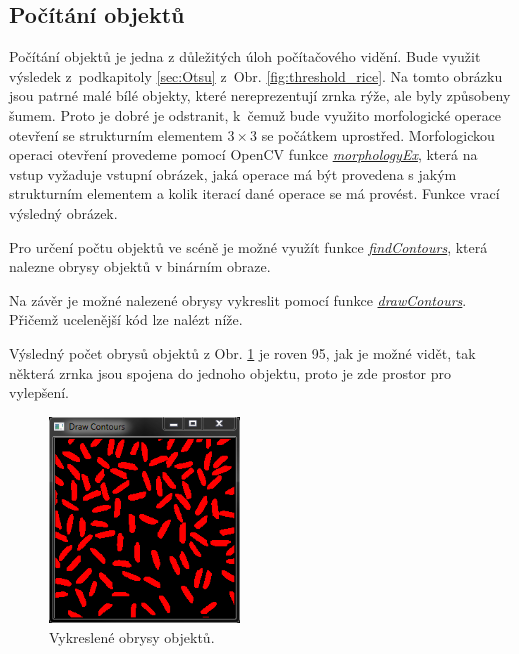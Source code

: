 \documentclass[12pt, a4paper]{article}
\begin{document}
\newpage








\subsection{Počítání objektů}

\par{Počítání objektů je jedna z důležitých úloh počítačového vidění. Bude využit výsledek z~podkapitoly \ref{sec:Otsu} z~Obr. \ref{fig:threshold_rice}. Na tomto obrázku jsou patrné malé bílé objekty, které nereprezentují zrnka rýže, ale byly způsobeny šumem. Proto je dobré je odstranit, k~čemuž bude využito morfologické operace otevření se strukturním elementem $3 \times 3$ se počátkem uprostřed. Morfologickou operaci otevření provedeme pomocí OpenCV funkce \href{http://docs.opencv.org/modules/imgproc/doc/filtering.html?highlight=morphologyex#cv2.morphologyEx}{\textit{morphologyEx}}, která na vstup vyžaduje vstupní obrázek, jaká operace má být provedena s jakým strukturním elementem a kolik iterací dané operace se má provést. Funkce vrací výsledný obrázek.

Pro určení počtu objektů ve scéně je možné využít funkce \href{http://docs.opencv.org/modules/imgproc/doc/structural_analysis_and_shape_descriptors.html?highlight=findcontours#cv2.findContours}{\textit{findContours}}, která nalezne obrysy objektů v binárním obraze.

Na závěr je možné nalezené obrysy vykreslit pomocí funkce \href{http://docs.opencv.org/modules/imgproc/doc/structural_analysis_and_shape_descriptors.html?highlight=drawcontours#cv2.drawContours}{\textit{drawContours}}. Přičemž ucelenější kód lze nalézt níže.

Výsledný počet obrysů objektů z Obr. \ref{fig:contours_rice} je roven 95, jak je možné vidět, tak některá zrnka jsou spojena do jednoho objektu, proto je zde prostor pro vylepšení.
\begin{figure}[!ht]
	\centering
	\includegraphics[width=0.45\textwidth]{contours_rice.png}
	\caption{Vykreslené obrysy objektů.}
	\label{fig:contours_rice}
\end{figure}
}
\end{document}
